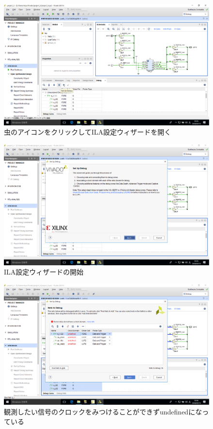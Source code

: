 \documentclass[a4paper,dvipdfmx]{jsarticle}
\begin{document}
 \begin{figure}[H]
  \begin{center}
   \includegraphics[width=.8\textwidth]{chapter08_figures/VirtualBox_Windows10_19_03_2018_23_55_50.png}
  \end{center}
  \caption{虫のアイコンをクリックしてILA設定ウィザードを開く}
 \end{figure}

 \begin{figure}[H]
  \begin{center}
   \includegraphics[width=.8\textwidth]{chapter08_figures/VirtualBox_Windows10_19_03_2018_23_55_56.png}
  \end{center}
  \caption{ILA設定ウィザードの開始}
 \end{figure}

 \begin{figure}[H]
  \begin{center}
   \includegraphics[width=.8\textwidth]{chapter08_figures/VirtualBox_Windows10_19_03_2018_23_56_09.png}
  \end{center}
  \caption{観測したい信号のクロックをみつけることができずundefinedになっている}
 \end{figure}
\end{document}
